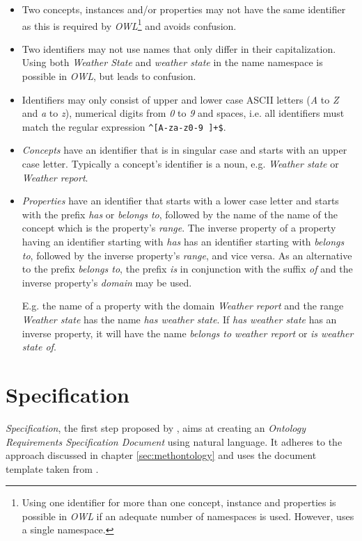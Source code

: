 \begin{itemize}
  \item Two concepts, instances and/or properties may not have the same identifier as this is required by \emph{OWL}\cite{OWL}\footnote{Using one identifier for more than one concept, instance and properties is possible in \emph{OWL} if an adequate number of namespaces is used. However, \thinkhomeweather uses a single namespace.} and avoids confusion.
  \item Two identifiers may not use names that only differ in their capitalization. Using both \emph{Weather State} and \emph{weather state} in the name namespace is possible in \emph{OWL}, but leads to confusion.
  \item Identifiers may only consist of upper and lower case ASCII letters (\emph{A} to \emph{Z} and \emph{a} to \emph{z}), numerical digits from \emph{0} to \emph{9} and spaces, i.e. all identifiers must match the regular expression \texttt{\textasciicircum[A-za-z0-9~]+\$}.
  \item \emph{Concepts} have an identifier that is in singular case and starts with an upper case letter. Typically a concept's identifier is a noun, e.g. \emph{Weather state} or \emph{Weather report}.
  \item \emph{Properties} have an identifier that starts with a lower case letter and starts with the prefix \emph{has} or \emph{belongs to}, followed by the name of the name of the concept which is the property's \emph{range}. The inverse property of a property having an identifier starting with \emph{has} has an identifier starting with \emph{belongs to}, followed by the inverse property's \emph{range}, and vice versa. As an alternative to the prefix \emph{belongs to}, the prefix \emph{is} in conjunction with the suffix \emph{of} and the inverse property's \emph{domain} may be used.
  
  E.g. the name of a property with the domain \emph{Weather report} and the range \emph{Weather state} has the name \emph{has weather state}. If \emph{has weather state} has an inverse property, it will have the name \emph{belongs to weather report} or \emph{is weather state of}.
\end{itemize}


\section{Specification}
\label{sec:ontology_specification}

\emph{Specification}, the first step proposed by \methontology, aims at creating an \emph{Ontology Requirements Specification Document} using natural language. It adheres to the approach discussed in chapter \ref{sec:methontology} and uses the document template taken from \cite{ORSD}.

